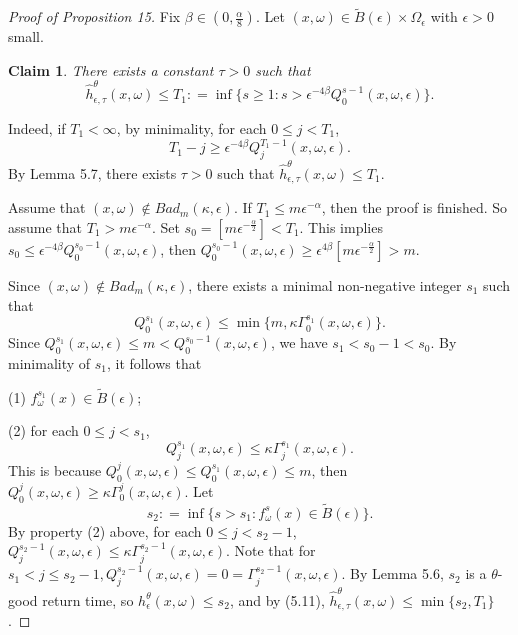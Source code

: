 \documentclass[11pt,oneside]{article}
\newtheorem*{claim}{Claim}
\theoremstyle{plain}
\numberwithin{equation}{section}
\numberwithin{figure}{section}
\numberwithin{table}{section}
\begin{document}
\begin{proof}[Proof of Proposition 15]

Fix $\beta \in (0, \frac{\alpha}{8})$. Let  $(x, \omega) \in \tilde B(\epsilon) \times \Omega_{\epsilon}$ with $\epsilon > 0$ small. 


\begin{claim}
There exists a constant $\tau > 0$ such that 
\begin{equation}
\hat h_{\epsilon, \tau}^{\theta} (x, \omega) \leq T_1 : = \inf \{s \geq 1 : s > \epsilon^{-4 \beta} Q_0^{s-1} (x, \omega, \epsilon) \}.
\end{equation}
\end{claim}

Indeed, if $T_1 < \infty$, by minimality, for each $0 \leq j < T_1$,
\[
T_1 - j \geq \epsilon^{-4 \beta} Q_j^{T_1-1} (x, \omega, \epsilon).
\]
By Lemma 5.7, there exists $\tau > 0$ such that $\hat h_{\epsilon, \tau}^{\theta} (x, \omega) \leq T_1$. 


Assume that $(x, \omega) \notin Bad_m(\kappa, \epsilon)$. If $T_1 \leq m \epsilon^{- \alpha}$, then the proof is finished. So assume that $T_1 > m \epsilon^{- \alpha}$. Set $s_0 = [m \epsilon^{- \frac{\alpha}{2}}] < T_1$. This implies $s_0 \leq \epsilon^{-4 \beta} Q_0^{s_0-1} (x, \omega, \epsilon)$, then $Q_0^{s_0-1} (x, \omega, \epsilon) \geq \epsilon^{4 \beta} [m \epsilon^{- \frac{\alpha}{2}}] > m$. 


Since $(x, \omega) \notin Bad_m(\kappa, \epsilon)$, there exists a minimal non-negative integer $s_1$ such that 
\[
Q_0^{s_1} (x, \omega, \epsilon) \leq \min \{ m, \kappa \Gamma_0^{s_1} (x, \omega, \epsilon) \}.
\]
Since $Q_0^{s_1} (x, \omega, \epsilon) \leq m  < Q_0^{s_0 -1} (x, \omega, \epsilon)$, we have $s_1 < s_0 -1 < s_0$. By minimality of $s_1$, it follows that 

(1) $f_{\omega}^{s_1} (x) \in \tilde B(\epsilon)$;

(2) for each $0 \leq j < s_1$, 
\[
Q_j^{s_1} (x, \omega, \epsilon) \leq \kappa \Gamma_j^{s_1} (x, \omega, \epsilon).
\]
This is because $Q_0^j (x, \omega, \epsilon) \leq Q_0^{s_1} (x, \omega, \epsilon) \leq m$, then $Q_0^j (x, \omega, \epsilon) \geq \kappa \Gamma_0^j (x, \omega, \epsilon)$. Let 
\[
s_2 : = \inf\{s > s_1 : f_{\omega}^s(x) \in \tilde B(\epsilon) \}.
\]
By property (2) above, for each $0 \leq j < s_2 -1$, $Q_j^{s_2-1} (x, \omega, \epsilon) \leq \kappa \Gamma_j^{s_2-1} (x, \omega, \epsilon)$. Note that for $s_1 < j \leq s_2 -1,  Q_j^{s_2-1} (x, \omega, \epsilon)= 0 =  \Gamma_j^{s_2-1} (x, \omega, \epsilon)$. By Lemma 5.6, $s_2$ is a $\theta$-good return time, so $h_{\epsilon}^{\theta} (x, \omega)  \leq s_2$, and by (5.11), $\hat h_{\epsilon, \tau}^{\theta} (x, \omega) \leq \min\{s_2, T_1 \}$.



\end{proof}
\end{document}
